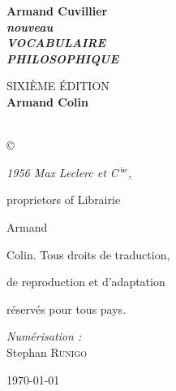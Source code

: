 \begin{titlepage}
%

\begin{flushright}
{\large {\bf Armand Cuvillier}}\\[1.9cm]

{\Large \textbf{\textit {nouveau}}}\\[0.5cm]

{\huge \textbf{\textit {VOCABULAIRE}}  \\[0.5cm]
\textbf{\textit {PHILOSOPHIQUE}}\\[1.1cm] }

{\normalsize SIXIÈME ÉDITION}\\[0.5cm]

\vfill
{\large {\bf Armand Colin}\\[0.5cm]
{}}\\[0.5cm]

\vfill
\end{flushright}
\copyright {\it 1956 Max Leclerc et C$^\text{\,ie}$,

proprietors of Librairie} Armand

Colin. Tous droits de traduction,

de reproduction et d'adaptation

réservés pour tous pays.

\vfill

\begin{minipage}{0.4\textwidth}
\begin{flushleft} \large
\emph{Numérisation :}\\
Stephan \textsc{Runigo}
\end{flushleft}
\end{minipage}
\begin{minipage}{0.4\textwidth}
\begin{flushright} 
\end{flushright}
\end{minipage}

\vfill

{\large \today}

\end{titlepage}
